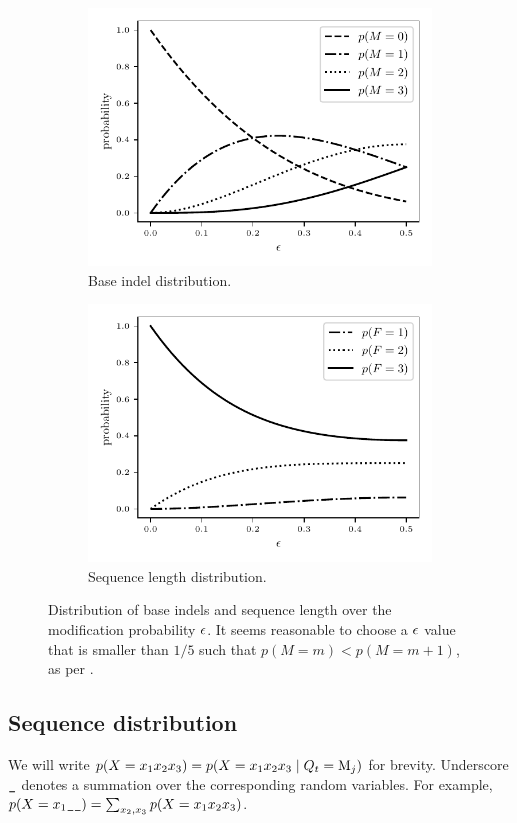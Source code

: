 \begin{figure}[htbp]
  \centering
  \captionsetup{width=0.85\linewidth}
  \begin{subfigure}{.5\linewidth}
    \centering
    \includegraphics[width=.7\linewidth]{figure/indel-prob}
    \caption{Base indel distribution.}\label{fig:indel-dist}
  \end{subfigure}%
  \begin{subfigure}{.5\linewidth}
    \centering
    \includegraphics[width=.7\linewidth]{figure/seq-len-prob}
    \caption{Sequence length distribution.}\label{fig:len-dist}
  \end{subfigure}
  \caption{ Distribution of base indels and sequence length over the modification probability
  $\epsilon$. It seems reasonable to choose a $\epsilon$ value that is smaller than $1/5$ such that
  $p(M=m)<p(M=m+1)$, as per . }\label{fig:dist}
\end{figure}

\subsection{Sequence distribution}

We will write $p(X=x_1x_2x_3) = p(X=x_1x_2x_3 \;|\; Q_t = \mathrm M_j)$ for brevity.
Underscore $\s$ denotes a summation over the corresponding random variables.
For example, $p(X=x_1\s\s)=\sum_{x_2,x_3}p(X=x_1x_2x_3)$.

